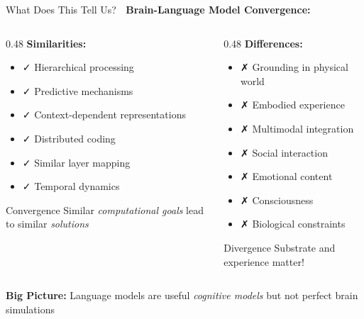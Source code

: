 \documentclass[aspectratio=169]{beamer}
\begin{document}
\begin{frame}{What Does This Tell Us? 🤔}
\textbf{Brain-Language Model Convergence:}

\vspace{1em}

\begin{columns}[T]
\begin{column}{0.48\textwidth}
\textbf{Similarities:}
\begin{itemize}
    \item ✓ Hierarchical processing
    \item ✓ Predictive mechanisms
    \item ✓ Context-dependent representations
    \item ✓ Distributed coding
    \item ✓ Similar layer mapping
    \item ✓ Temporal dynamics
\end{itemize}

\vspace{0.5em}

\begin{alertblock}{Convergence}
Similar \textit{computational goals} lead to similar \textit{solutions}
\end{alertblock}
\end{column}

\begin{column}{0.48\textwidth}
\textbf{Differences:}
\begin{itemize}
    \item ✗ Grounding in physical world
    \item ✗ Embodied experience
    \item ✗ Multimodal integration
    \item ✗ Social interaction
    \item ✗ Emotional content
    \item ✗ Consciousness
    \item ✗ Biological constraints
\end{itemize}

\vspace{0.5em}

\begin{alertblock}{Divergence}
Substrate and experience matter!
\end{alertblock}
\end{column}
\end{columns}

\vspace{1em}

\begin{center}
\textbf{Big Picture:} Language models are useful \textit{cognitive models} but not perfect brain simulations
\end{center}
\end{frame}
\end{document}
